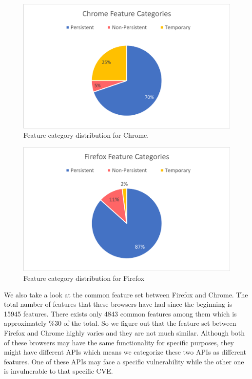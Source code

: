 \begin{figure}[ht]
    \centering
    \includegraphics[width=\columnwidth]{figures/chrome-feature-categories.png}
    \caption{Feature category distribution for Chrome.}
    \label{fig:chrome-categories}
\end{figure}

\begin{figure}[ht]
    \centering
    \includegraphics[width=\columnwidth]{figures/firefox-feature-categories.png}
    \caption{Feature category distribution for Firefox}
    \label{fig:times_bar}
\end{figure}


We also take a look at the common feature set between Firefox and Chrome. The total number of features that these browsers have had since the beginning is 15945 features. There exists only 4843 common features among them which is approximately \%30 of the total. So we figure out that the feature set between Firefox and Chrome highly varies and they are not much similar. Although both of these browsers may have the same functionality for specific purposes, they might have different APIs which means we categorize these two APIs as different features. One of these APIs may face a specific vulnerability while the other one is invulnerable to that specific CVE.

